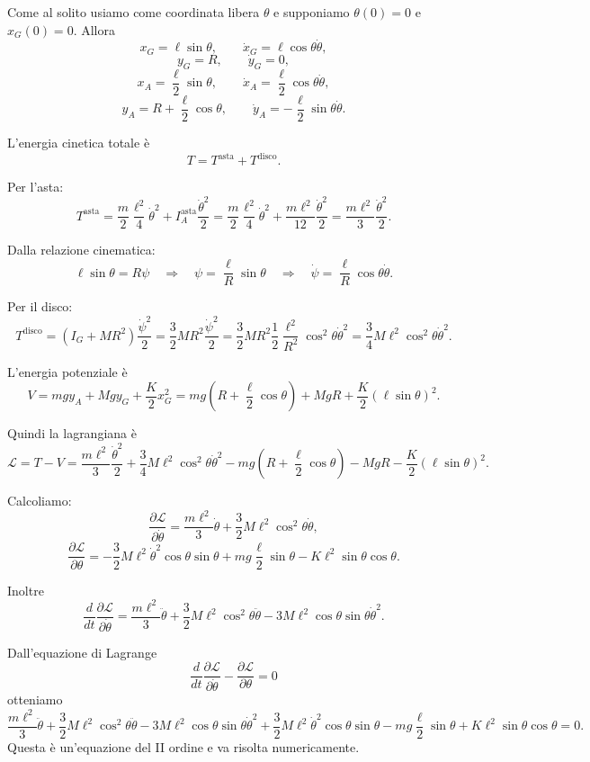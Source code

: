 \begin{example}{}
\begin{center}
\begin{tikzpicture}[
    x=1cm,
    y=1cm,
    >=Latex,
    line cap=round,
    line join=round,
    every node/.style={font=\small}
]
\end{tikzpicture}
  \end{center}
Come al solito usiamo come coordinata libera $\theta$ e supponiamo $\theta(0)=0$ e $x_G(0)=0$. Allora
\[
x_G = \ell \sin\theta,
\qquad
\dot{x}_G = \ell \cos\theta \dot{\theta},
\]
\[
y_G = R,
\qquad
\dot{y}_G = 0,
\]
\[
x_A = \frac{\ell}{2}\sin\theta,
\qquad
\dot{x}_A = \frac{\ell}{2}\cos\theta \dot{\theta},
\]
\[
y_A = R + \frac{\ell}{2}\cos\theta,
\qquad
\dot{y}_A = -\frac{\ell}{2}\sin\theta \dot{\theta}.
\]

L'energia cinetica totale è
\[
T = T^{\mathrm{asta}} + T^{\mathrm{disco}}.
\]

Per l'asta:
\[
T^{\mathrm{asta}}
=
\frac{m}{2}\frac{\ell^2}{4}\dot{\theta}^2
+
I_A^{\mathrm{asta}}\frac{\dot{\theta}^2}{2}
=
\frac{m}{2}\frac{\ell^2}{4}\dot{\theta}^2
+
\frac{m\ell^2}{12}\frac{\dot{\theta}^2}{2}
=
\frac{m\ell^2}{3}\frac{\dot{\theta}^2}{2}.
\]

Dalla relazione cinematica:
\[
\ell \sin\theta = R\psi
\quad \Longrightarrow \quad
\psi = \frac{\ell}{R}\sin\theta
\quad \Longrightarrow \quad
\dot{\psi} = \frac{\ell}{R}\cos\theta \dot{\theta}.
\]

Per il disco:
\[
T^{\mathrm{disco}}
=
\left(I_G + MR^2\right)\frac{\dot{\psi}^2}{2}
=
\frac{3}{2}MR^2\frac{\dot{\psi}^2}{2}
=
\frac{3}{2}MR^2\frac{1}{2}
\frac{\ell^2}{R^2}\cos^2\theta \dot{\theta}^2
=
\frac{3}{4}M\ell^2\cos^2\theta \dot{\theta}^2.
\]

L'energia potenziale è
\[
V
=
mg y_A + Mg y_G + \frac{K}{2}x_G^2
=
mg\left(R+\frac{\ell}{2}\cos\theta\right)
+
MgR
+
\frac{K}{2}\left(\ell \sin\theta\right)^2.
\]

Quindi la lagrangiana è
\[
\mathcal{L}
=
T - V
=
\frac{m\ell^2}{3}\frac{\dot{\theta}^2}{2}
+
\frac{3}{4}M\ell^2\cos^2\theta \dot{\theta}^2
-
mg\left(R+\frac{\ell}{2}\cos\theta\right)
-
MgR
-
\frac{K}{2}\left(\ell \sin\theta\right)^2.
\]

Calcoliamo:
\[
\frac{\partial \mathcal{L}}{\partial \dot{\theta}}
=
\frac{m\ell^2}{3}\dot{\theta}
+
\frac{3}{2}M\ell^2\cos^2\theta \dot{\theta},
\]
\[
\frac{\partial \mathcal{L}}{\partial \theta}
=
-\frac{3}{2}M\ell^2\dot{\theta}^2\cos\theta\sin\theta
+
mg\frac{\ell}{2}\sin\theta
-
K\ell^2\sin\theta\cos\theta.
\]

Inoltre
\[
\frac{d}{dt}
\frac{\partial \mathcal{L}}{\partial \dot{\theta}}
=
\frac{m\ell^2}{3}\ddot{\theta}
+
\frac{3}{2}M\ell^2\cos^2\theta \ddot{\theta}
-
3M\ell^2\cos\theta\sin\theta \dot{\theta}^2.
\]

Dall'equazione di Lagrange
\[
\frac{d}{dt}
\frac{\partial \mathcal{L}}{\partial \dot{\theta}}
-
\frac{\partial \mathcal{L}}{\partial \theta}
=
0
\]
otteniamo
\[
\frac{m\ell^2}{3}\ddot{\theta}
+
\frac{3}{2}M\ell^2\cos^2\theta \ddot{\theta}
-
3M\ell^2\cos\theta\sin\theta \dot{\theta}^2
+
\frac{3}{2}M\ell^2\dot{\theta}^2\cos\theta\sin\theta
-
mg\frac{\ell}{2}\sin\theta
+
K\ell^2\sin\theta\cos\theta
=
0.
\]
Questa è un'equazione del II ordine e va risolta numericamente.
\end{example}



